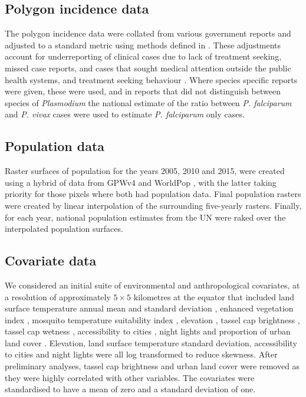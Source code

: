 \documentclass[10pt,letterpaper]{article}
\begin{document}
\subsection*{Polygon incidence data}


The polygon incidence data were collated from various government reports and adjusted to a standard metric using methods defined in \cite{cibulskis2011worldwide}.
These adjustments account for underreporting of clinical cases due to lack of treatment seeking, missed case reports, and cases that sought medical attention outside the public health systems, and treatment seeking behaviour \cite{battle2016treatment}.
Where species specific reports were given, these were used, and in reports that did not distinguish between species of \emph{Plasmodium} the national estimate of the ratio between \emph{P. falciparum} and \emph{P. vivax} cases were used to estimate \emph{P. falciparum} only cases.



\subsection*{Population data}

Raster surfaces of population for the years 2005, 2010 and 2015, were created using a hybrid of data from GPWv4 \cite{gpw4} and WorldPop \cite{tatem2017worldpop}, with the latter taking priority for those pixels where both had population data. 
Final population rasters were created by linear interpolation of the surrounding five-yearly rasters.
Finally, for each year, national population estimates from the UN were raked over the interpolated population surfaces. 

\subsection*{Covariate data}

We considered an initial suite of environmental and anthropological covariates, at a resolution of approximately $5 \times 5$ kilometres at the equator that included land surface temperature annual mean and standard deviation \cite{LST}, enhanced vegetation index \cite{TCB}, mosquito temperature suitability index \cite{weiss2014air}, elevation \cite{SRTMElev}, tassel cap brightness \cite{TCB}, tassel cap wetness \cite{TCB}, accessibility to cities \cite{weiss2018global}, night lights \cite{} and proportion of urban land cover \cite{}.
Elevation, land surface temperature standard deviation, accessibility to cities and night lights were all log transformed to reduce skewness.
After preliminary analyses, tassel cap brightness and urban land cover were removed as they were highly correlated with other variables.
The covariates were standardised to have a mean of zero and a standard deviation of one.
\end{document}
